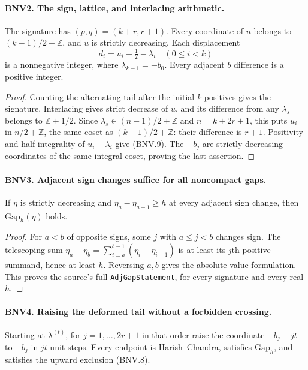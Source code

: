 \documentclass[11pt,a4paper]{article}
\numberwithin{equation}{section}
\theoremstyle{remark}\newtheorem{remark}[theorem]{Remark}
\begin{document}
\paragraph{BNV2. The sign, lattice, and interlacing arithmetic.}
\label{claim:BNV2}
The signature has $(p,q)=(k+r,r+1)$.  Every coordinate of $u$ belongs to
$(k-1)/2+\mathbb Z$, and $u$ is strictly decreasing.  Each displacement
\[
 d_i=u_i-\tfrac12-\lambda_i\quad(0\le i<k)
 \tag{BNV.9}
\]
is a nonnegative integer, where $\lambda_{k-1}=-b_0$.
Every adjacent $b$ difference is a positive integer.

\begin{proof}
Counting the alternating tail after the initial $k$ positives gives the
signature.  Interlacing gives strict decrease of $u$, and its difference
from any $\lambda_s$ belongs to $\mathbb Z+1/2$.  Since
$\lambda_s\in(n-1)/2+\mathbb Z$ and $n=k+2r+1$, this puts
$u_i$ in $n/2+\mathbb Z$, the same coset as $(k-1)/2+\mathbb Z$:
their difference is $r+1$.  Positivity and half-integrality of
$u_i-\lambda_i$ give (BNV.9).  The $-b_j$ are strictly decreasing
coordinates of the same integral coset, proving the last assertion.
\end{proof}

\paragraph{BNV3. Adjacent sign changes suffice for all noncompact gaps.}
\label{claim:BNV3}
If $\eta$ is strictly decreasing and
$\eta_a-\eta_{a+1}\ge h$ at every adjacent sign change, then
$\mathrm{Gap}_h(\eta)$ holds.

\begin{proof}
For $a<b$ of opposite signs, some $j$ with $a\le j<b$ changes sign.
The telescoping sum
$\eta_a-\eta_b=\sum_{i=a}^{b-1}(\eta_i-\eta_{i+1})$
is at least its $j$th positive summand, hence at least $h$.  Reversing
$a,b$ gives the absolute-value formulation.  This proves the source's full
\texttt{Adj\allowbreak Gap\allowbreak Statement}, for every signature and every real $h$.
\end{proof}

\paragraph{BNV4. Raising the deformed tail without a forbidden crossing.}
\label{claim:BNV4}
Starting at $\lambda^{(t)}$, for $j=1,\ldots,2r+1$ in that order raise
the coordinate $-b_j-jt$ to $-b_j$ in $jt$ unit steps.  Every endpoint is
Harish--Chandra, satisfies $\mathrm{Gap}_h$, and satisfies the upward
exclusion (BNV.8).
\end{document}
